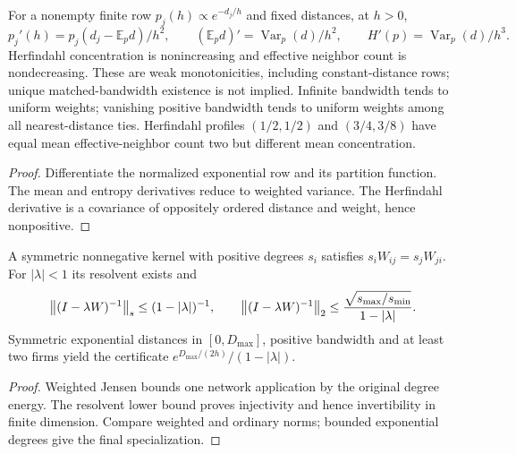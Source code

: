 \begin{theorem}\label{thm:bandwidth-effects}
  \leanok
  For a nonempty finite row $p_j(h)\propto e^{-d_j/h}$ and fixed distances,
  at $h>0$,
  \[
    p_j'(h)=p_j(d_j-\mathbb E_p d)/h^2,\qquad
    (\mathbb E_p d)'=\operatorname{Var}_p(d)/h^2,\qquad
    H'(p)=\operatorname{Var}_p(d)/h^3.
  \]
  Herfindahl concentration is nonincreasing and effective neighbor count is
  nondecreasing. These are weak monotonicities, including constant-distance
  rows; unique matched-bandwidth existence is not implied.
  Infinite bandwidth tends to uniform weights; vanishing positive bandwidth
  tends to uniform weights among all nearest-distance ties. Herfindahl
  profiles $(1/2,1/2)$ and $(3/4,3/8)$ have equal mean effective-neighbor
  count two but different mean concentration.
\end{theorem}
\begin{proof}\leanok
  Differentiate the normalized exponential row and its partition function.
  The mean and entropy derivatives reduce to weighted variance. The
  Herfindahl derivative is a covariance of oppositely ordered distance and
  weight, hence nonpositive.
\end{proof}

\begin{theorem}\label{thm:reversible-resolvent}
  \leanok
  A symmetric nonnegative kernel with positive degrees $s_i$ satisfies
  $s_iW_{ij}=s_jW_{ji}$. For $|\lambda|<1$ its resolvent exists and
  \[
    \left\lVert(I-\lambda W)^{-1}\right\rVert_s\le(1-|\lambda|)^{-1},\qquad
    \left\lVert(I-\lambda W)^{-1}\right\rVert_2
    \le\frac{\sqrt{s_{\max}/s_{\min}}}{1-|\lambda|}.
  \]
  Symmetric exponential distances in $[0,D_{\max}]$, positive bandwidth and
  at least two firms yield the certificate
  $e^{D_{\max}/(2h)}/(1-|\lambda|)$.
\end{theorem}
\begin{proof}\leanok
  Weighted Jensen bounds one network application by the original degree
  energy. The resolvent lower bound proves injectivity and hence
  invertibility in finite dimension. Compare weighted and ordinary norms;
  bounded exponential degrees give the final specialization.
\end{proof}


